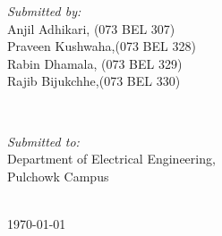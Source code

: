 \begin{titlepage}
	\begin{minipage}{0.4\textwidth}
		\begin{flushleft} 
			\emph{Submitted by:}\\
			Anjil Adhikari, (073 BEL 307)\\
			Praveen Kushwaha,(073 BEL 328)\\
			Rabin Dhamala, (073 BEL 329)\\
			Rajib Bijukchhe,(073 BEL 330)\\
		\end{flushleft}
	\end{minipage}
	~	
	\begin{minipage}{0.5\textwidth}
		\begin{flushright} 
			\emph{Submitted to:} \\
			Department of Electrical Engineering, \\
			Pulchowk Campus
		\end{flushright}
	\end{minipage}\\[2cm]



	{\large \today}\\[2cm] %




	\vfill %
\end{titlepage}

